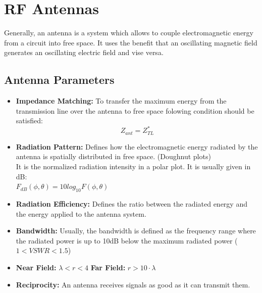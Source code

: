 \section{RF Antennas}
Generally, an antenna is a system which allows to couple electromagnetic energy from a circuit into free space. It uses the benefit that an oscillating magnetic field generates an oscillating electric field and vise versa.

\subsection{Antenna Parameters}

\begin{minipage}{10cm}
\begin{itemize}
	\item \textbf{Impedance Matching:} To transfer the maximum energy from the transmission line over the antenna to free space folowing condition should be satisfied:
	\begin{equation}
	Z_{ant} = Z^*_{TL} 
	\end{equation}
	\item \textbf{Radiation Pattern:} Defines how the electromagnetic energy radiated by the antenna is spatially distributed in free space. (Doughnut plots)\\ It is the normalized radiation intensity in a polar plot. It is usually given in dB: \\
	$F_{dB}(\phi,\theta)=10log_{10}F(\phi,\theta)$
	\item \textbf{Radiation Efficiency:} Defines the ratio between the radiated energy and the energy applied to the antenna system.
	\item \textbf{Bandwidth:} Usually, the bandwidth is defined as the frequency range where the radiated power is up to 10dB below the maximum radiated power ( $1<VSWR<1.5$)
	\item \textbf{Near Field:} $\lambda < r < 4$	\hspace{2cm} \textbf{Far Field:} $ r > 10\cdot \lambda$
	\item \textbf{Reciprocity:} An antenna receives signals as good as it can transmit them.

\end{itemize}
\end{minipage}
